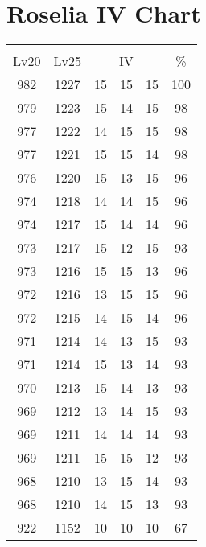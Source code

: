 \documentclass{article}%
\begin{document}
%
\normalsize%
\section{Roselia IV Chart}%
\label{sec:Roselia IV Chart}%
\renewcommand{\arraystretch}{1.5}%
\begin{tabular}{|c|c|c|c|c|c|}%
\hline%
\multicolumn{6}{|c|}{\textcolor{white}{ 
\linebreak{Roselia}
}%
\cellcolor{black}}\\%
\multicolumn{1}{|c}{Lv20}&\multicolumn{1}{c|}{Lv25}&\multicolumn{3}{c|}{IV}&\multicolumn{1}{|c|}{\%}\\%
\hline%
\rowcolor{color100}%
982&1227&15&15&15&100\\%
\hline%
\rowcolor{color98}%
979&1223&15&14&15&98\\%
\hline%
\rowcolor{color98}%
977&1222&14&15&15&98\\%
\hline%
\rowcolor{color98}%
977&1221&15&15&14&98\\%
\hline%
\rowcolor{color96}%
976&1220&15&13&15&96\\%
\hline%
\rowcolor{color96}%
974&1218&14&14&15&96\\%
\hline%
\rowcolor{color96}%
974&1217&15&14&14&96\\%
\hline%
\rowcolor{color93}%
973&1217&15&12&15&93\\%
\hline%
\rowcolor{color96}%
973&1216&15&15&13&96\\%
\hline%
\rowcolor{color96}%
972&1216&13&15&15&96\\%
\hline%
\rowcolor{color96}%
972&1215&14&15&14&96\\%
\hline%
\rowcolor{color93}%
971&1214&14&13&15&93\\%
\hline%
\rowcolor{color93}%
971&1214&15&13&14&93\\%
\hline%
\rowcolor{color93}%
970&1213&15&14&13&93\\%
\hline%
\rowcolor{color93}%
969&1212&13&14&15&93\\%
\hline%
\rowcolor{color93}%
969&1211&14&14&14&93\\%
\hline%
\rowcolor{color93}%
969&1211&15&15&12&93\\%
\hline%
\rowcolor{color93}%
968&1210&13&15&14&93\\%
\hline%
\rowcolor{color93}%
968&1210&14&15&13&93\\%
\hline%
\rowcolor{color91}%
922&1152&10&10&10&67\\%
\end{tabular}

%
\end{document}
